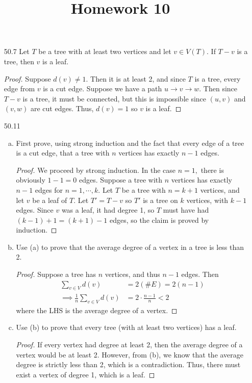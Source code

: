 \documentclass{article}
\begin{document}
\title{Homework 10}
\maketitle
\thispagestyle{fancy}

\begin{itemize}
	\item[50.7] Let $T$ be a tree with at least two vertices and let $v\in V(T).$ If $T-v$ is a tree, then $v$ is a leaf.
		\begin{proof}
			Suppose $d(v)\neq 1.$ Then it is at least 2, and since $T$ is a tree, every edge from $v$ is a cut edge. Suppose we have a path $u\to v\to w.$ Then since $T-v$ is a tree, it must be connected, but this is impossible since $(u, v)$ and $(v, w)$ are cut edges. Thus, $d(v)=1$ so $v$ is a leaf.
		\end{proof}

	\item[50.11] 
		\begin{enumerate}[(a)]
			\item First prove, using strong induction and the fact that every edge of a tree is a cut edge, that a tree with $n$ vertices has exactly $n-1$ edges.
				\begin{proof}
					We proceed by strong induction. In the case $n=1,$ there is obviously $1-1=0$ edges. Suppose a tree with $n$ vertices has exactly $n-1$ edges for $n=1, \cdots, k.$ Let $T$ be a tree with $n=k+1$ vertices, and let $v$ be a leaf of $T.$ Let $T'=T-v$ so $T'$ is a tree on $k$ vertices, with $k-1$ edges. Since $v$ was a leaf, it had degree 1, so $T$ must have had $(k-1)+1=(k+1)-1$ edges, so the claim is proved by induction.
				\end{proof}

			\item Use (a) to prove that the average degree of a vertex in a tree is less than 2.
				\begin{proof}
					Suppose a tree has $n$ vertices, and thus $n-1$ edges. Then 
					\begin{align*}
						\sum_{v\in V}^{}d(v) &= 2(\# E) = 2(n-1) \\
						\implies \frac{1}{n} \sum_{v\in V}^{} d(v) &= 2\cdot \frac{n-1}{n} < 2
					\end{align*}
					where the LHS is the average degree of a vertex.
				\end{proof}

			\item Use (b) to prove that every tree (with at least two vertices) has a leaf.
				\begin{proof}
					If every vertex had degree at least 2, then the average degree of a vertex would be at least 2. However, from (b), we know that the average degree is strictly less than 2, which is a contradiction. Thus, there must exist a vertex of degree 1, which is a leaf.
				\end{proof}


\end{enumerate}
\end{itemize}
\end{document}
